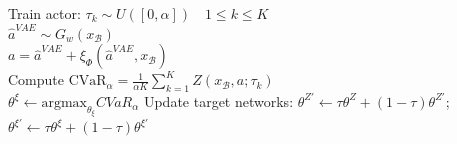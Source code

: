 \begin{algorithm}[H]
{      \textcolor{mygray}{Train actor:}\;
        $\tau_k \sim U([0,\alpha]) \quad 1\leq k \leq K$\\
        $\hat{a}^{VAE} \sim{G_w(x_\mathcal{B})}$\\
        $a=\hat{a}^{VAE} + \xi_\Phi(\hat{a}^{VAE}, x_\mathcal{B})$\\
        Compute $\text{CVaR}_\alpha=\frac{1}{\alpha K}\sum_{k=1}^K Z(x_\mathcal{B},a;\tau_k)$\\
        $\theta^\xi \leftarrow \text{argmax}_{\theta_\xi} {CVaR}_\alpha$\;
      \textcolor{mygray}{Update target networks:}\;
        $\theta^{Z'}\leftarrow \tau\theta^Z + (1-\tau)\theta^{Z'} $;
        $\theta^{\xi'}\leftarrow \tau\theta^\xi + (1-\tau)\theta^{\xi'} $\\
    }
    \label{pseudocode:algo2}
    \caption{$\thenameoff$}
\end{algorithm}
